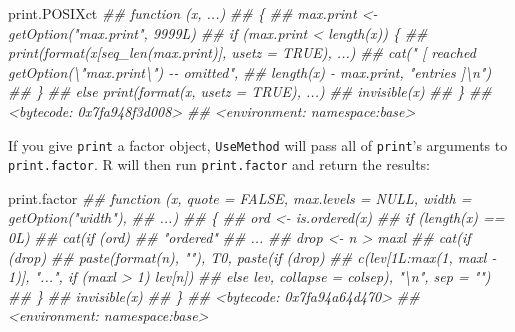 \documentclass[
  letterpaper,
  DIV=11,
  numbers=noendperiod]{scrbook}
\newenvironment{Shaded}{\begin{snugshade}}{\end{snugshade}}
\newcommand{\DocumentationTok}[1]{\textcolor[rgb]{0.37,0.37,0.37}{\textit{#1}}}
\newcommand{\NormalTok}[1]{\textcolor[rgb]{0.00,0.23,0.31}{#1}}
\begin{document}
\begin{Shaded}
\begin{Highlighting}[]
\NormalTok{print.POSIXct}
\DocumentationTok{\#\# function (x, ...) }
\DocumentationTok{\#\# \{}
\DocumentationTok{\#\#     max.print \textless{}{-} getOption("max.print", 9999L)}
\DocumentationTok{\#\#     if (max.print \textless{} length(x)) \{}
\DocumentationTok{\#\#         print(format(x[seq\_len(max.print)], usetz = TRUE), ...)}
\DocumentationTok{\#\#         cat(" [ reached getOption(\textbackslash{}"max.print\textbackslash{}") {-}{-} omitted", }
\DocumentationTok{\#\#             length(x) {-} max.print, "entries ]\textbackslash{}n")}
\DocumentationTok{\#\#     \}}
\DocumentationTok{\#\#     else print(format(x, usetz = TRUE), ...)}
\DocumentationTok{\#\#     invisible(x)}
\DocumentationTok{\#\# \}}
\DocumentationTok{\#\# \textless{}bytecode: 0x7fa948f3d008\textgreater{}}
\DocumentationTok{\#\# \textless{}environment: namespace:base\textgreater{}}
\end{Highlighting}
\end{Shaded}

If you give \texttt{print} a factor object, \texttt{UseMethod} will pass
all of \texttt{print}'s arguments to \texttt{print.factor}. R will then
run \texttt{print.factor} and return the results:

\begin{Shaded}
\begin{Highlighting}[]
\NormalTok{print.factor}
\DocumentationTok{\#\# function (x, quote = FALSE, max.levels = NULL, width = getOption("width"), }
\DocumentationTok{\#\#     ...) }
\DocumentationTok{\#\# \{}
\DocumentationTok{\#\#     ord \textless{}{-} is.ordered(x)}
\DocumentationTok{\#\#     if (length(x) == 0L) }
\DocumentationTok{\#\#         cat(if (ord) }
\DocumentationTok{\#\#             "ordered"}
\DocumentationTok{\#\# ...}
\DocumentationTok{\#\#         drop \textless{}{-} n \textgreater{} maxl}
\DocumentationTok{\#\#         cat(if (drop) }
\DocumentationTok{\#\#             paste(format(n), ""), T0, paste(if (drop) }
\DocumentationTok{\#\#             c(lev[1L:max(1, maxl {-} 1)], "...", if (maxl \textgreater{} 1) lev[n])}
\DocumentationTok{\#\#         else lev, collapse = colsep), "\textbackslash{}n", sep = "")}
\DocumentationTok{\#\#     \}}
\DocumentationTok{\#\#     invisible(x)}
\DocumentationTok{\#\# \}}
\DocumentationTok{\#\# \textless{}bytecode: 0x7fa94a64d470\textgreater{}}
\DocumentationTok{\#\# \textless{}environment: namespace:base\textgreater{}}
\end{Highlighting}
\end{Shaded}
\end{document}
